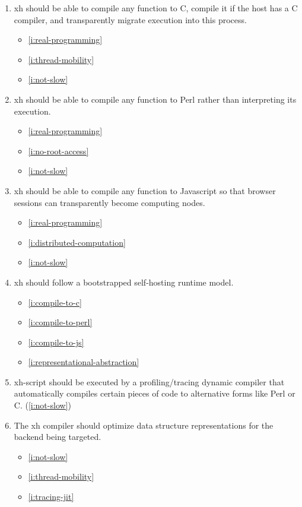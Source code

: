 \documentclass{report}
\makeatletter
\newcommand*{\Label}[2]{%
  \@bsphack
  \begingroup
    \label{#1-original}%
    \def\@currentlabel{#2 [\ref{#1-original}]}%
    \label{#1}%
  \endgroup
  \@esphack
}
\makeatother
\begin{document}
\begin{enumerate}
\item{}\Label{i:compile-to-c}{xh2c}
  xh should be able to compile any function to C, compile it if the host
  has a C compiler, and transparently migrate execution into this process.
\begin{itemize}
\item \ref{i:real-programming}
\item \ref{i:thread-mobility}
\item \ref{i:not-slow}
\end{itemize}
\item{}\Label{i:compile-to-perl}{xh2perl}
  xh should be able to compile any function to Perl rather than
  interpreting its execution.
\begin{itemize}
\item \ref{i:real-programming}
\item \ref{i:no-root-access}
\item \ref{i:not-slow}
\end{itemize}
\item{}\Label{i:compile-to-js}{xh2js}
  xh should be able to compile any function to Javascript so that browser
  sessions can transparently become computing nodes.
\begin{itemize}
\item \ref{i:real-programming}
\item \ref{i:distributed-computation}
\item \ref{i:not-slow}
\end{itemize}
\item{}\Label{i:self-hosting-runtime}{selfhost}
  xh should follow a bootstrapped self-hosting runtime model.
\begin{itemize}
\item \ref{i:compile-to-c}
\item \ref{i:compile-to-perl}
\item \ref{i:compile-to-js}
\item \ref{i:representational-abstraction}
\end{itemize}
\item{}\Label{i:tracing-jit}{dynamiccompiler}
  xh-script should be executed by a profiling/tracing dynamic compiler that
  automatically compiles certain pieces of code to alternative forms like
  Perl or C.
(\ref{i:not-slow})
\item{}\Label{i:representational-abstraction}{abstractstruct}
  The xh compiler should optimize data structure representations for the
  backend being targeted.
\begin{itemize}
\item \ref{i:not-slow}
\item \ref{i:thread-mobility}
\item \ref{i:tracing-jit}
\end{itemize}


\end{enumerate}
\end{document}
